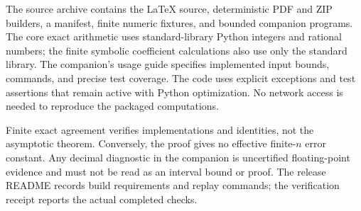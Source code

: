 \documentclass[11pt,letterpaper]{article}
\numberwithin{equation}{section}
\theoremstyle{remark}\newtheorem{remark}[theorem]{Remark}
\begin{document}
The source archive contains the LaTeX source, deterministic PDF and
ZIP builders, a manifest, finite numeric fixtures, and bounded
companion programs. The core exact arithmetic uses standard-library
Python integers and rational numbers; the finite symbolic
coefficient calculations also use only the standard library. The companion's usage guide specifies implemented input bounds,
commands, and precise test coverage. The code uses explicit exceptions
and test assertions that remain active with Python optimization.
No network access is needed to reproduce the packaged computations.

Finite exact agreement verifies implementations and identities, not
the asymptotic theorem. Conversely, the proof gives no effective
finite-$n$ error constant. Any decimal diagnostic in the companion is
uncertified floating-point evidence and must not be read as an interval
bound or proof. The release README records build requirements and
replay commands; the verification receipt reports the actual completed
checks.
\end{document}
